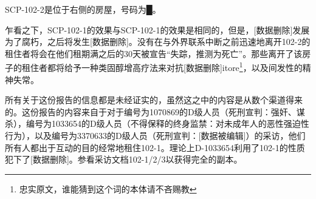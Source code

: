 SCP-102-2是位于右侧的房屋，号码为█。

乍看之下，SCP-102-1的效果与SCP-102-1的效果是相同的，但是，{[}数据删除]发展为了腐朽，之后将发生{[}数据删除]。没有在与外界联系中断之前迅速地离开102-2的租住者将会在他们租期满之后的30天被宣告“失踪，推测为死亡”。那些离开了该房子的租住者都将给予一种类固醇增高疗法来对抗{[}数据删除]itore\footnote{忠实原文，谁能猜到这个词的本体请不吝赐教}，以及间发性的精神失常。

所有关于这份报告的信息都是未经证实的，虽然这之中的内容是从数个渠道得来的。这份报告的内容来自于对于编号为1070869的D级人员（死刑宣判：强奸、谋杀），编号为1033654的D级人员（不得保释的终身监禁：对未成年人的恶性强迫性行为），以及编号为3370633的D级人员（死刑宣判：{[}数据被编辑]）的采访，他们所有人都出于互动的目的经常地租住102-1。理论上D-1033654利用了102-1的性质犯下了{[}数据删除]。参看采访文档102-1\slash 2\slash 3以获得完全的副本。
